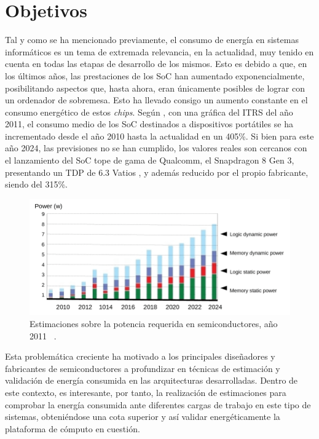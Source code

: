 
\chapter{Objetivos}
\label{cap:Objetivo}

Tal y como se ha mencionado previamente, el consumo de energía en sistemas informáticos es un tema de extremada relevancia, en la actualidad, muy tenido en cuenta en todas las etapas de desarrollo de los mismos. Esto es debido a que, en los últimos años, las prestaciones de los \ac{SoC} han aumentado exponencialmente, posibilitando aspectos que, hasta ahora, eran únicamente posibles de lograr con un ordenador de sobremesa. Esto ha llevado consigo un aumento constante en el consumo energético de estos \textit{chips}. Según \cite{energiaSoc}, con una gráfica del \ac{ITRS} del año 2011, el consumo medio de los \ac{SoC} destinados a dispositivos portátiles se ha incrementado desde el año 2010 hasta la actualidad en un 405\%. Si bien para este año 2024, las previsiones no se han cumplido, los valores reales son cercanos con el lanzamiento del \ac{SoC} tope de gama de Qualcomm, el Snapdragon 8 Gen 3, presentando un \ac{TDP} de 6.3 Vatios \cite{snapdragon8}, y además reducido por el propio fabricante, siendo del 315\%. 

\begin{figure}[H]
    \centering
    \includegraphics[width=0.95\linewidth, height=0.45\textwidth]{figs/itrs-previsiones.png}
    \caption{Estimaciones sobre la potencia requerida en semiconductores, año 2011 ~\cite{energiaSoc}.}
\end{figure}

Esta problemática creciente ha motivado a los principales diseñadores y fabricantes de semiconductores a profundizar en técnicas de estimación y validación de energía consumida en las arquitecturas desarrolladas. Dentro de este contexto, es interesante, por tanto, la realización de estimaciones para comprobar la energía consumida ante diferentes cargas de trabajo en este tipo de sistemas, obteniéndose una cota superior y así validar energéticamente la plataforma de cómputo en cuestión.

